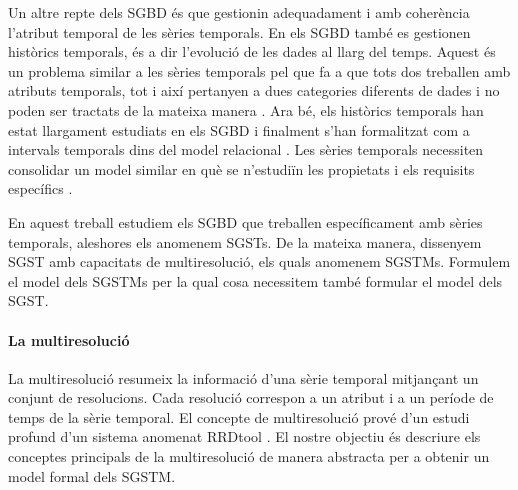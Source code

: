 
Un altre repte dels \gls{SGBD} és que gestionin adequadament i amb coherència
l'atribut temporal de les sèries temporals.  En els \gls{SGBD} també
es gestionen històrics temporals, és a dir l'evolució de les dades al
llarg del temps. Aquest és un problema similar a les sèries temporals
pel que fa a que tots dos treballen amb atributs temporals, tot i així
pertanyen a dues categories diferents de dades i no poden ser tractats
de la mateixa manera \parencite{assfalg08:thesis,schmidt95}.  Ara bé,
els històrics temporals han estat llargament estudiats en els
\gls{SGBD} i finalment s'han formalitzat com a intervals temporals
dins del model relacional \parencite{date02:_tempor_data_relat_model}.
Les sèries temporals necessiten consolidar un model similar en què se
n'estudiïn les propietats i els requisits
específics \parencite{dreyer94,segev87:sigmod}.




En aquest treball estudiem els \gls{SGBD} que treballen
específicament amb sèries temporals, aleshores els anomenem
\glspl{SGST}. De la mateixa manera, dissenyem \gls{SGST} amb
capacitats de multiresolució, els quals anomenem
\glspl{SGSTM}. Formulem el model dels \glspl{SGSTM} per la qual cosa
necessitem també formular el model dels \gls{SGST}.








\paragraph{La multiresolució}
La multiresolució resumeix la informació d'una sèrie temporal
mitjançant un conjunt de resolucions. Cada resolució correspon a un
atribut i a un període de temps de la sèrie temporal. El concepte de
multiresolució prové d'un estudi profund d'un sistema anomenat
RRDtool \parencite{rrdtool}. El nostre objectiu és descriure els
conceptes principals de la multiresolució de manera abstracta per a
obtenir un model formal dels \gls{SGSTM}.

